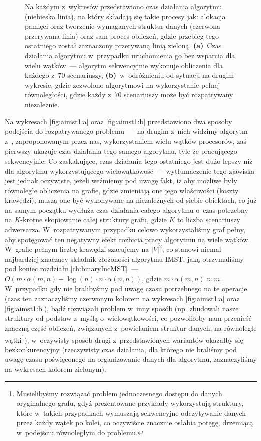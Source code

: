\begin{figure}[!htbp]
{		Na każdym z~wykresów przedstawiono czas działania algorytmu (niebieska linia), na który składają się takie procesy jak: alokacja pamięci oraz tworzenie wymaganych struktur danych (czerwona przerywana linia) oraz sam proces obliczeń, gdzie przebieg tego ostatniego został zaznaczony przerywaną linią zieloną.
		 \textbf{(a)}~Czas działania algorytmu w~przypadku uruchomienia go bez wsparcia dla wielu wątków~--- algorytm sekwencyjnie wykonuje obliczenia dla każdego z~$70$ scenariuszy,
		 \textbf{(b)}~w~odróżnieniu od sytuacji na drugim wykresie, gdzie zezwolono algorytmowi na wykorzystanie pełnej równoległości, gdzie każdy z~$70$ scenariuszy może być rozpatrywany niezależnie.
	}
	\label{fig:aimst1}
\end{figure}

Na wykresach \ref{fig:aimst1:a} oraz \ref{fig:aimst1:b} przedstawiono dwa sposoby podejścia do rozpatrywanego problemu~--- na drugim z~nich widzimy algorytm z~, zaproponowanym przez nas, wykorzystaniem wielu wątków procesorów, zaś pierwszy ukazuje czas działania tego samego algorytmu, tyle że pracującego sekwencyjnie.
Co zaskakujące, czas działania tego ostatniego jest dużo lepszy niż dla algorytmu wykorzystującego wielowątkowość~--- wytłumaczenie tego zjawiska jest jednak oczywiste, jeżeli weźmiemy pod uwagę fakt, iż aby możliwe były równoległe obliczenia na grafie, gdzie zmieniają one jego właściwości (koszty krawędzi), muszą one być wykonywane na niezależnych od siebie obiektach, co już na samym początku wydłuża czas działania całego algorytmu o~czas potrzebny na $K$-krotne skopiowanie całej struktury grafu, gdzie $K$ to liczba scenariuszy adwersarza. 
W~rozpatrywanym przypadku celowo wykorzystaliśmy graf pełny, aby spotęgować ten negatywny efekt rozbicia pracy algorytmu na wiele wątków.
W~grafie pełnym liczbę krawędzi szacujemy na $\left| V \right|^{2}$, co stanowi niemal najbardziej znaczący składnik złożoności algorytmu \textsc{IMST}, jaką otrzymaliśmy pod koniec rozdziału \ref{ch:binaryIncMST}~--- $O \left( m \cdot \alpha  \left( m, n \right) + \log \left( n \right) \cdot n \cdot \alpha \left( n, n \right) \right)$, gdzie $m \cdot \alpha  \left( m, n \right) \approx m$. 
W~przypadku gdy nie bralibyśmy pod uwagę czasu potrzebnego na te operacje (czas ten zaznaczyliśmy czerwonym kolorem na wykresach \ref{fig:aimst1:a} oraz \ref{fig:aimst1:b}), bądź rozwiązali problem w~inny sposób (np. zbudowali nasze struktury od podstaw z~myślą o~wielowątkowości, co pozwoliłoby nam przenieść znaczną część obliczeń, związanych z~powielaniem struktur danych, na równoległe wątki\footnote{
	Musielibyśmy rozwiązać problem jednoczesnego dostępu do danych oryginalnego grafu, gdyż prezentowane przykłady wykorzystują struktury, które w~takich przypadkach wymuszają sekwencyjne odczytywanie danych przez każdy wątek po kolei, co oczywiście znacznie osłabia potęgę, drzemiącą w~podejściu równoległym do problemu.
}), w~oczywisty sposób drugi z~przedstawionych wariantów okazałby się bezkonkurencyjny (rzeczywisty czas działania, dla którego nie braliśmy pod uwagę czasu poświęconego na organizowanie danych dla algorytmu, zaznaczyliśmy na wykresach kolorem zielonym).




